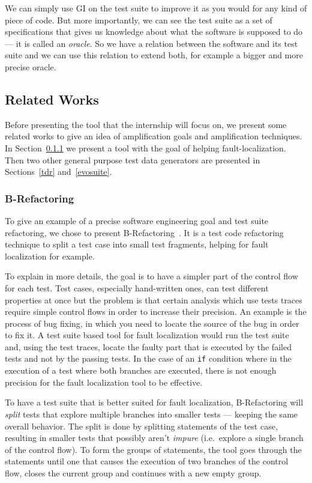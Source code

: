 \documentclass[11pt]{sdm}
\begin{document}
We can simply use GI on the test suite to improve it as you would for any kind of piece of code.
But more importantly, we can see the test suite as a set of specifications that gives us knowledge about what the software is supposed to do --- it is called an \textit{oracle}.
So we have a relation between the software and its test suite and we can use this relation to extend both, for example a bigger and more precise oracle.


\subsection{Related Works}
\label{related}
Before presenting the tool that the internship will focus on, we present some related works to give an idea of amplification goals and amplification techniques.
In Section~\ref{brefactoring} we present a tool with the goal of helping fault-localization.
Then two other general purpose test data generators are presented in Sections~\ref{tdr} and~\ref{evosuite}.

\subsubsection{B-Refactoring}
\label{brefactoring}
To give an example of a precise software engineering goal and test suite refactoring, we chose to present B-Refactoring~\cite{xuan2016b}.
It is a test code refactoring technique to split a test case into small test fragments, helping for fault localization for example.

To explain in more details, the goal is to have a simpler part of the control flow for each test.
Test cases, especially hand-written ones, can test different properties at once but the problem is that certain analysis which use tests traces require simple control flows in order to increase their precision.
An example is the process of bug fixing, in which you need to locate the source of the bug in order to fix it.
A test suite based tool for fault localization would run the test suite and, using the test traces, locate the faulty part that is executed by the failed tests and not by the passing tests.
In the case of an \texttt{if} condition where in the execution of a test where both branches are executed, there is not enough precision for the fault localization tool to be effective.

To have a test suite that is better suited for fault localization, B-Refactoring will \textit{split} tests that explore multiple branches into smaller tests --- keeping the same overall behavior.
The split is done by splitting statements of the test case, resulting in smaller tests that possibly aren't \textit{impure} (i.e.\ explore a single branch of the control flow).
To form the groups of statements, the tool goes through the statements until one that causes the execution of two branches of the control flow, closes the current group and continues with a new empty group.
\end{document}
